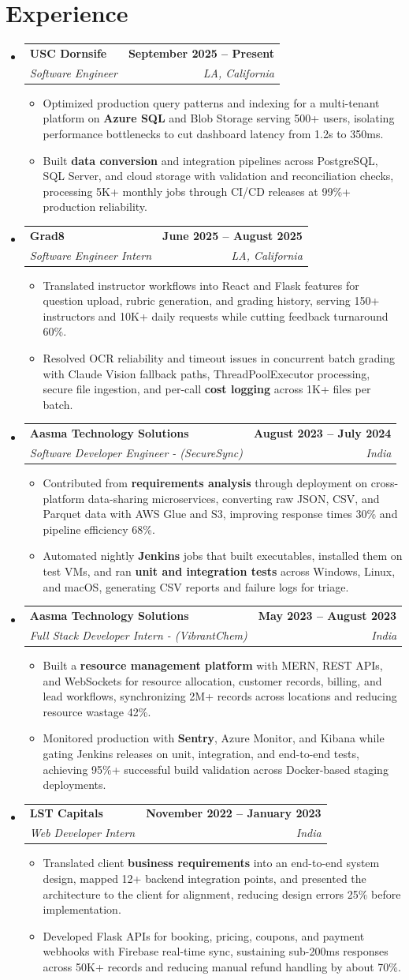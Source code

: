 \documentclass[letterpaper,10pt]{article}
\makeatletter
\newcommand{\itemTail}{\vspace{-4pt}}
\newcommand{\sectionGap}{\vspace{-8pt}}
\newcommand{\roleGap}{\vspace{2pt}}
\newcommand{\resumeItem}[1]{\item\small{{#1 \itemTail}}}
\newcommand{\resumeSubheading}[4]{\vspace{-1pt}\item\begin{tabular*}{1.0\textwidth}[t]{l@{\extracolsep{\fill}}r}\textbf{#1} & \textbf{\small #2} \\\textit{\small#3} & \textit{\small #4} \\\end{tabular*}\vspace{-2pt}}
\newcommand{\resumeSubHeadingListStart}{\begin{itemize}[leftmargin=0.0in, label={}]}
\newcommand{\resumeSubHeadingListEnd}{\end{itemize}}
\newcommand{\resumeItemListStart}{\begin{itemize}[leftmargin=0.15in,label=\textbullet,itemsep=3pt,topsep=0pt,parsep=0pt,partopsep=0pt]}
\newcommand{\resumeItemListEnd}{\end{itemize}\vspace{-4pt}}
\makeatother
\begin{document}
\section{Experience}
\resumeSubHeadingListStart
\resumeSubheading{USC Dornsife}{September 2025 -- Present}{Software Engineer}{LA, California}
\resumeItemListStart
\resumeItem{Optimized production query patterns and indexing for a multi-tenant platform on \textbf{Azure SQL} and Blob Storage serving 500+ users, isolating performance bottlenecks to cut dashboard latency from 1.2s to 350ms.}
\resumeItem{Built \textbf{data conversion} and integration pipelines across PostgreSQL, SQL Server, and cloud storage with validation and reconciliation checks, processing 5K+ monthly jobs through CI/CD releases at 99\%+ production reliability.}
\resumeItemListEnd
\roleGap
\resumeSubheading{Grad8}{June 2025 -- August 2025}{Software Engineer Intern}{LA, California}
\resumeItemListStart
\resumeItem{Translated instructor workflows into React and Flask features for question upload, rubric generation, and grading history, serving 150+ instructors and 10K+ daily requests while cutting feedback turnaround 60\%.}
\resumeItem{Resolved OCR reliability and timeout issues in concurrent batch grading with Claude Vision fallback paths, ThreadPoolExecutor processing, secure file ingestion, and per-call \textbf{cost logging} across 1K+ files per batch.}
\resumeItemListEnd
\roleGap
\resumeSubheading{Aasma Technology Solutions}{August 2023 -- July 2024}{Software Developer Engineer - (SecureSync)}{India}
\resumeItemListStart
\resumeItem{Contributed from \textbf{requirements analysis} through deployment on cross-platform data-sharing microservices, converting raw JSON, CSV, and Parquet data with AWS Glue and S3, improving response times 30\% and pipeline efficiency 68\%.}
\resumeItem{Automated nightly \textbf{Jenkins} jobs that built executables, installed them on test VMs, and ran \textbf{unit and integration tests} across Windows, Linux, and macOS, generating CSV reports and failure logs for triage.}
\resumeItemListEnd
\roleGap
\resumeSubheading{Aasma Technology Solutions}{May 2023 -- August 2023}{Full Stack Developer Intern - (VibrantChem)}{India}
\resumeItemListStart
\resumeItem{Built a \textbf{resource management platform} with MERN, REST APIs, and WebSockets for resource allocation, customer records, billing, and lead workflows, synchronizing 2M+ records across locations and reducing resource wastage 42\%.}
\resumeItem{Monitored production with \textbf{Sentry}, Azure Monitor, and Kibana while gating Jenkins releases on unit, integration, and end-to-end tests, achieving 95\%+ successful build validation across Docker-based staging deployments.}
\resumeItemListEnd
\roleGap
\resumeSubheading{LST Capitals}{November 2022 -- January 2023}{Web Developer Intern}{India}
\resumeItemListStart
\resumeItem{Translated client \textbf{business requirements} into an end-to-end system design, mapped 12+ backend integration points, and presented the architecture to the client for alignment, reducing design errors 25\% before implementation.}
\resumeItem{Developed Flask APIs for booking, pricing, coupons, and payment webhooks with Firebase real-time sync, sustaining sub-200ms responses across 50K+ records and reducing manual refund handling by about 70\%.}
\resumeItemListEnd
\resumeSubHeadingListEnd
\sectionGap
\end{document}
